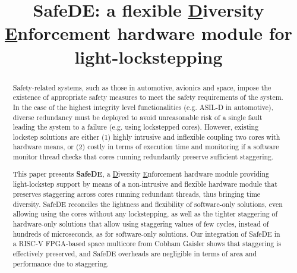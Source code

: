 \documentclass[conference,a4paper,10pt]{IEEEtran}
\begin{document}
\title{SafeDE: a flexible \underline{D}iversity \underline{E}nforcement hardware module for light-lockstepping}


\author{
  }

\maketitle

\begin{abstract}
Safety-related systems, such as those in automotive, avionics and space, impose the existence of appropriate safety measures to meet the safety requirements of the system. In the case of the highest integrity level functionalities (e.g. ASIL-D in automotive), diverse redundancy must be deployed to avoid unreasonable risk of a single fault leading the system to a failure (e.g. using lockstepped cores). 
However, existing lockstep solutions are either (1) highly intrusive and inflexible coupling two cores with hardware means, or (2) costly in terms of execution time and monitoring if a software monitor thread checks that cores running redundantly preserve sufficient staggering.

This paper presents \textbf{SafeDE}, a \underline{D}iversity \underline{E}nforcement hardware module providing light-lockstep support by means of a non-intrusive and flexible hardware module that preserves staggering across cores running redundant threads, thus bringing time diversity. SafeDE reconciles the lightness and flexibility of software-only solutions, even allowing using the cores without any lockstepping, as well as the tighter staggering of hardware-only solutions that allow using staggering values of few cycles, instead of hundreds of microseconds, as for software-only solutions.
Our integration of SafeDE in a RISC-V FPGA-based space multicore from Cobham Gaisler shows that staggering is effectively preserved, and SafeDE overheads are negligible in terms of area and performance due to staggering.
\end{abstract}
\end{document}
